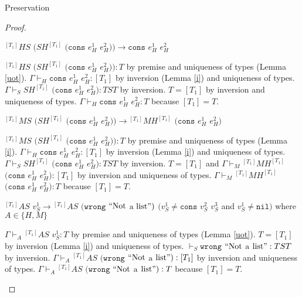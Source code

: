 \begin{theorem}{Preservation}
\begin{proof}
\begin{case}
$^{[T_{1}]}HS$ $(SH^{[T_{1}]}$ $(\mathtt{cons}$ $e_{H}^{1}$ $e_{H}^{2}))\rightarrow\mathtt{cons}$ $e_{H}^{1}$ $e_{H}^{2}$

$^{[T_{1}]}HS$ $(SH^{[T_{1}]}$ $(\mathtt{cons}$ $e_{H}^{1}$ $e_{H}^{2})):T$ by premise and uniqueness of types (Lemma \ref{uot}).  $\Gamma\vdash_{H}\mathtt{cons}$ $e_{H}^{1}$ $e_{H}^{2}:[T_{1}]$ by inversion (Lemma \ref{i}) and uniqueness of types.  $\Gamma\vdash_{S}SH^{[T_{1}]}$ $(\mathtt{cons}$ $e_{H}^{1}$ $e_{H}^{2}):TST$ by inversion.  $T=[T_{1}]$ by inversion and uniqueness of types.  $\Gamma\vdash_{H}\mathtt{cons}$ $e_{H}^{1}$ $e_{H}^{2}:T$ because $[T_{1}]=T$.
\end{case}


\begin{case}
$^{[T_{1}]}MS$ $(SH^{[T_{1}]}$ $(\mathtt{cons}$ $e_{H}^{1}$ $e_{H}^{2}))\rightarrow{^{[T_{1}]}M}H^{[T_{1}]}$ $(\mathtt{cons}$ $e_{H}^{1}$ $e_{H}^{2})$

$^{[T_{1}]}MS$ $(SH^{[T_{1}]}$ $(\mathtt{cons}$ $e_{H}^{1}$ $e_{H}^{2})):T$ by premise and uniqueness of types (Lemma \ref{i}).  $\Gamma\vdash_{H}\mathtt{cons}$ $e_{H}^{1}$ $e_{H}^{2}:[T_{1}]$ by inversion (Lemma \ref{i}) and uniqueness of types.  $\Gamma\vdash_{S}SH^{[T_{1}]}$ $(\mathtt{cons}$ $e_{H}^{1}$ $e_{H}^{2}):TST$ by inversion.  $T=[T_{1}]$ and $\Gamma\vdash_{M}{^{[T_{1}]}M}H^{[T_{1}]}$ $(\mathtt{cons}$ $e_{H}^{1}$ $e_{H}^{2}):[T_{1}]$ by inversion and uniqueness of types.  $\Gamma\vdash_{M}{^{[T_{1}]}M}H^{[T_{1}]}$ $(\mathtt{cons}$ $e_{H}^{1}$ $e_{H}^{2}):T$ because $[T_{1}]=T$.
\end{case}


\begin{case}
$^{[T_{1}]}AS$ $v_{S}^{1}\rightarrow{^{[T_{1}]}A}S$ $(\mathtt{wrong}$ $\mathrm{``Not}$ $\mathrm{a}$ $\mathrm{list"})$ $(v_{S}^{1}\neq\mathtt{cons}$ $v_{S}^{2}$ $v_{S}^{3}$ and $v_{S}^{1}\neq\mathtt{nil})$ where $A\in\lbrace H,M\rbrace$

$\Gamma\vdash_{A}{^{[T_{1}]}AS}$ $v_{S}^{1}:T$ by premise and uniqueness of types (Lemma \ref{uot}).  $T=[T_{1}]$ by inversion (Lemma \ref{i}) and uniqueness of types.  $\vdash_{S}\mathtt{wrong}$ $\mathrm{``Not}$ $\mathrm{a}$ $\mathrm{list"}:TST$ by inversion.  $\Gamma\vdash_{A}{^{[T_{1}]}A}S$ $(\mathtt{wrong}$ $\mathrm{``Not}$ $\mathrm{a}$ $\mathrm{list"}):[T_{1}]$ by inversion and uniqueness of types.  $\Gamma\vdash_{A}{^{[T_{1}]}A}S$ $(\mathtt{wrong}$ $\mathrm{``Not}$ $\mathrm{a}$ $\mathrm{list"}):T$ because $[T_{1}]=T$.
\end{case}


\end{proof}
\end{theorem}
